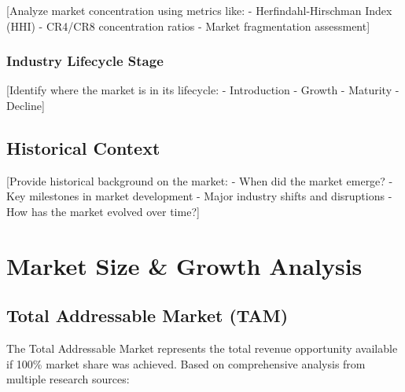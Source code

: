 \documentclass[11pt,letterpaper]{report}
\begin{document}
[Analyze market concentration using metrics like:
- Herfindahl-Hirschman Index (HHI)
- CR4/CR8 concentration ratios
- Market fragmentation assessment]

\subsection{Industry Lifecycle Stage}

[Identify where the market is in its lifecycle:
- Introduction
- Growth
- Maturity
- Decline]

\section{Historical Context}

[Provide historical background on the market:
- When did the market emerge?
- Key milestones in market development
- Major industry shifts and disruptions
- How has the market evolved over time?]

\chapter{Market Size \& Growth Analysis}

\section{Total Addressable Market (TAM)}

The Total Addressable Market represents the total revenue opportunity available if 100\% market share was achieved. Based on comprehensive analysis from multiple research sources:

\end{document}
